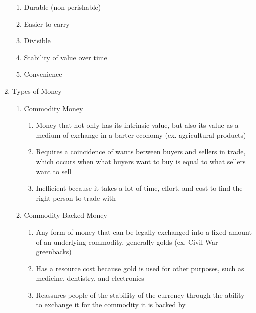 \documentclass[12pt]{article}
\begin{document}
\begin{enumerate}
\begin{enumerate}
          \item Durable (non-perishable)

          \item Easier to carry

          \item Divisible

          \item Stability of value over time

          \item Convenience

        \end{enumerate}

      \item Types of Money

        \begin{enumerate}

          \item Commodity Money

            \begin{enumerate}

              \item Money that not only has its intrinsic value, but also its value as a medium of exchange in a barter economy (ex. agricultural products)

              \item Requires a coincidence of wants between buyers and sellers in trade, which occurs when what buyers want to buy is equal to what sellers want to sell

              \item Inefficient because it takes a lot of time, effort, and cost to find the right person to trade with

            \end{enumerate}

          \item Commodity-Backed Money

            \begin{enumerate}

              \item Any form of money that can be legally exchanged into a fixed amount of an underlying commodity, generally golds (ex. Civil War greenbacks)

              \item Has a resource cost because gold is used for other purposes, such as medicine, dentistry, and electronics

              \item Reassures people of the stability of the currency through the ability to exchange it for the commodity it is backed by


\end{enumerate}
\end{enumerate}
\end{enumerate}
\end{document}
